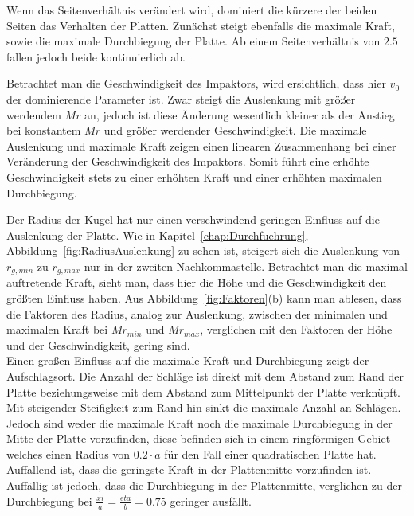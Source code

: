 Wenn das Seitenverhältnis verändert wird, dominiert die kürzere der beiden Seiten das Verhalten der Platten. Zunächst steigt ebenfalls die maximale Kraft, sowie die maximale Durchbiegung der Platte. Ab einem Seitenverhältnis von $2.5$ fallen jedoch beide kontinuierlich ab.

Betrachtet man die Geschwindigkeit des Impaktors, wird ersichtlich, dass hier $v_{0}$ der dominierende Parameter ist. Zwar steigt die Auslenkung mit größer werdendem $Mr$ an, jedoch ist diese Änderung wesentlich kleiner als der Anstieg bei konstantem $Mr$ und größer werdender Geschwindigkeit. Die maximale Auslenkung und maximale Kraft zeigen einen linearen Zusammenhang bei einer Veränderung der Geschwindigkeit des Impaktors. Somit führt eine erhöhte Geschwindigkeit stets zu einer erhöhten Kraft und einer erhöhten maximalen Durchbiegung.

Der Radius der Kugel hat nur einen verschwindend geringen Einfluss auf die Auslenkung der Platte. Wie in Kapitel~\ref{chap:Durchfuehrung}, Abbildung~\ref{fig:RadiusAuslenkung} zu sehen ist, steigert sich die Auslenkung von $r_{g,min}$ zu $r_{g,max}$ nur in der zweiten Nachkommastelle.
Betrachtet man die maximal auftretende Kraft, sieht man, dass hier die Höhe und die Geschwindigkeit den größten Einfluss haben. Aus Abbildung~\ref{fig:Faktoren}(b) kann man ablesen, dass die Faktoren des Radius, analog zur Auslenkung, zwischen der minimalen und maximalen Kraft bei $Mr_{min}$ und $Mr_{max}$, verglichen mit den Faktoren der Höhe und der Geschwindigkeit, gering sind. \\

Einen großen Einfluss auf die maximale Kraft und Durchbiegung zeigt der Aufschlagsort.
Die Anzahl der Schläge ist direkt mit dem Abstand zum Rand der Platte beziehungsweise mit dem Abstand zum Mittelpunkt der Platte verknüpft. Mit steigender Steifigkeit zum Rand hin sinkt die maximale Anzahl an Schlägen. Jedoch sind weder die maximale Kraft noch die maximale Durchbiegung in der Mitte der Platte vorzufinden, diese befinden sich in einem ringförmigen Gebiet welches einen Radius von $0.2 \cdot a$ für den Fall einer quadratischen Platte hat. Auffallend ist, dass die geringste Kraft in der Plattenmitte vorzufinden ist. Auffällig ist jedoch, dass die Durchbiegung in der Plattenmitte, verglichen zu der Durchbiegung bei $\frac{xi}{a} = \frac{eta}{b}= 0.75$ geringer ausfällt.


